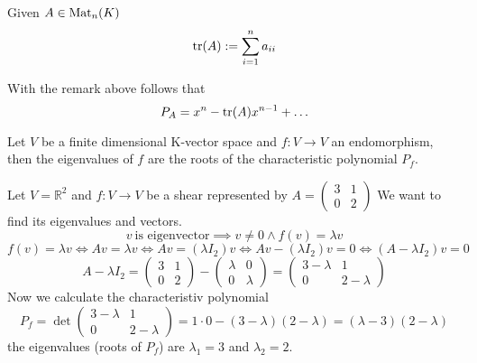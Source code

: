\begin{definition}
   Given \(A \in \operatorname{Mat}_n(K)\)
   \[\operatorname{tr}(A) := \sum_{i=1}^n a_{ii}\]
\end{definition}
\begin{remark}
   With the remark above follows that
   \[P_A = x^n - \operatorname{tr}(A)x^{n-1} + \ldots\]
\end{remark}

\begin{proposition}
   Let \(V\) be a finite dimensional K-vector space and \(f: V \to V\) an endomorphism, then the eigenvalues of \(f\) are the roots of the characteristic polynomial \(P_f\).
\end{proposition}
\begin{example}
   Let \(V = \mathbb{R}^2\) and \(f: V \to V\) be a shear represented by \(A = \begin{pmatrix}3&1\\0&2\end{pmatrix}\)
   We want to find its eigenvalues and vectors.
   \[v~\text{is eigenvector} \implies v \neq 0 \land f(v) = \lambda v\]
   \[f(v) = \lambda v \iff Av = \lambda v \iff Av = (\lambda I_2)v \iff A v - (\lambda I_2) v = 0 \iff (A - \lambda I_2) v = 0\]
   \[A - \lambda I_2 = \begin{pmatrix}3&1\\0&2\end{pmatrix} - \begin{pmatrix}\lambda&0\\0&\lambda\end{pmatrix} = \begin{pmatrix}3 - \lambda&1\\0&2 - \lambda\end{pmatrix}\]
   Now we calculate the characteristiv polynomial
   \[P_f = \det\begin{pmatrix}3 - \lambda&1\\0&2 - \lambda\end{pmatrix} = 1 \cdot 0 - (3 -\lambda)(2- \lambda) = (\lambda -3)(2 - \lambda)\]
   the eigenvalues (roots of \(P_f\)) are \(\lambda_1 = 3\) and \(\lambda_2 = 2\).


\end{example}
